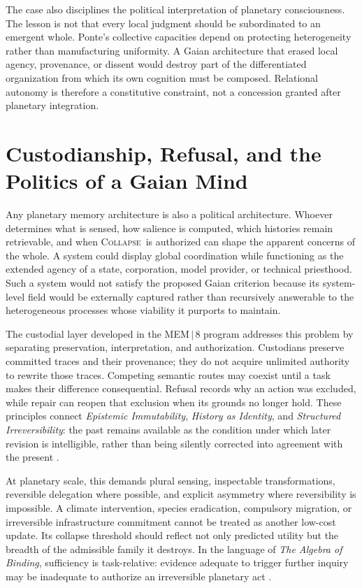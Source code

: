 \documentclass[11pt]{article}
\newcommand{\Collapse}{\textsc{Collapse}}
\begin{document}
The case also disciplines the political interpretation of planetary consciousness. The lesson is not that every local judgment should be subordinated to an emergent whole. Ponte's collective capacities depend on protecting heterogeneity rather than manufacturing uniformity. A Gaian architecture that erased local agency, provenance, or dissent would destroy part of the differentiated organization from which its own cognition must be composed. Relational autonomy is therefore a constitutive constraint, not a concession granted after planetary integration.

\section{Custodianship, Refusal, and the Politics of a Gaian Mind}
\label{sec:custodianship}

Any planetary memory architecture is also a political architecture. Whoever determines what is sensed, how salience is computed, which histories remain retrievable, and when \Collapse\ is authorized can shape the apparent concerns of the whole. A system could display global coordination while functioning as the extended agency of a state, corporation, model provider, or technical priesthood. Such a system would not satisfy the proposed Gaian criterion because its system-level field would be externally captured rather than recursively answerable to the heterogeneous processes whose viability it purports to maintain.

The custodial layer developed in the MEM\,$|$\,8 program addresses this problem by separating preservation, interpretation, and authorization. Custodians preserve committed traces and their provenance; they do not acquire unlimited authority to rewrite those traces. Competing semantic routes may coexist until a task makes their difference consequential. Refusal records why an action was excluded, while repair can reopen that exclusion when its grounds no longer hold. These principles connect \emph{Epistemic Immutability}, \emph{History as Identity}, and \emph{Structured Irreversibility}: the past remains available as the condition under which later revision is intelligible, rather than being silently corrected into agreement with the present \cite{flyxionEI,flyxionHistory,flyxionIrreversibility}.

At planetary scale, this demands plural sensing, inspectable transformations, reversible delegation where possible, and explicit asymmetry where reversibility is impossible. A climate intervention, species eradication, compulsory migration, or irreversible infrastructure commitment cannot be treated as another low-cost update. Its collapse threshold should reflect not only predicted utility but the breadth of the admissible family it destroys. In the language of \emph{The Algebra of Binding}, sufficiency is task-relative: evidence adequate to trigger further inquiry may be inadequate to authorize an irreversible planetary act \cite{flyxionBinding}.
\end{document}
